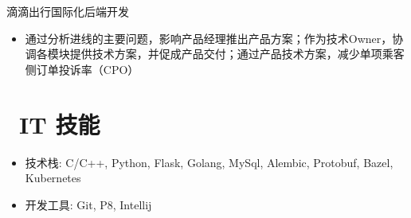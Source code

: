 \documentclass{resume}
\begin{document}
滴滴出行国际化后端开发
\begin{itemize}
  \item 通过分析进线的主要问题，影响产品经理推出产品方案；作为技术Owner，协调各模块提供技术方案，并促成产品交付；通过产品技术方案，减少单项乘客侧订单投诉率（CPO）
\end{itemize}



\section{\faCogs\ IT 技能}
\begin{itemize}[parsep=0.5ex]
  \item 技术栈: C/C++, Python, Flask, Golang, MySql, Alembic, Protobuf, Bazel, Kubernetes
  \item 开发工具: Git, P8, Intellij
\end{itemize}

%
%
\end{document}
